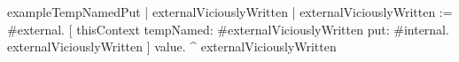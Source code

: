 \documentclass[a4paper,10pt,twoside]{book}
\begin{document}
\begin{code}{}
exampleTempNamedPut
    | externalViciouslyWritten |
    externalViciouslyWritten := #external.
    [ thisContext tempNamed: #externalViciouslyWritten put: #internal. externalViciouslyWritten ] value.
    ^ externalViciouslyWritten
\end{code}

% 















\ifx\wholebook\relax\else
   
   
\end{document}
